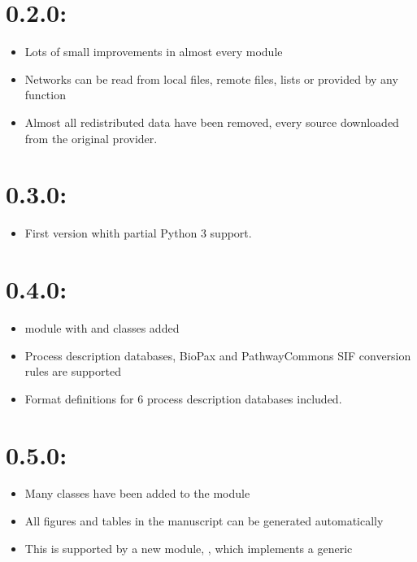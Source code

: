 \documentclass[letterpaper,10pt,english]{sphinxmanual}
\begin{document}
\section{0.2.0:}
\label{\detokenize{index:id2}}\begin{itemize}
\item {} 
Lots of small improvements in almost every module

\item {} 
Networks can be read from local files, remote files, lists or provided by
any function

\item {} 
Almost all redistributed data have been removed, every source downloaded
from the original provider.

\end{itemize}


\section{0.3.0:}
\label{\detokenize{index:id3}}\begin{itemize}
\item {} 
First version whith partial Python 3 support.

\end{itemize}


\section{0.4.0:}
\label{\detokenize{index:id4}}\begin{itemize}
\item {} 
 module with  and  classes added

\item {} 
Process description databases, BioPax and PathwayCommons SIF conversion
rules are supported

\item {} 
Format definitions for 6 process description databases included.

\end{itemize}


\section{0.5.0:}
\label{\detokenize{index:id5}}\begin{itemize}
\item {} 
Many classes have been added to the  module

\item {} 
All figures and tables in the manuscript can be generated automatically

\item {} 
This is supported by a new module, , which implements a generic

\end{itemize}
\end{document}
